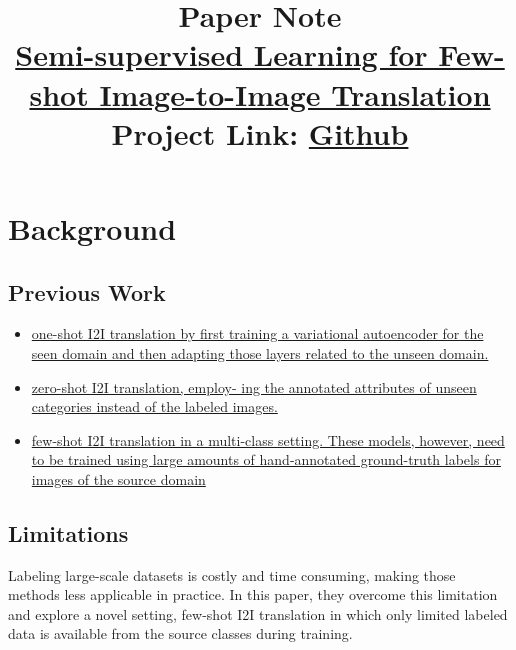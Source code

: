 \documentclass[10pt]{article}
\title{
    {\normalsize Paper Note} \\
    {\large \href{https://openaccess.thecvf.com/content_CVPR_2020/papers/Wang_Semi-Supervised_Learning_for_Few-Shot_Image-to-Image_Translation_CVPR_2020_paper.pdf}{Semi-supervised Learning for Few-shot Image-to-Image Translation
    }} \\
    {\normalsize Project Link: \href{https://github.com/yaxingwang/SEMIT}{Github}}
}
\begin{document}
    \maketitle

    \section{Background}
        \subsection*{Previous Work}
            \begin{itemize}
                \item \href{https://arxiv.org/pdf/1806.06029.pdf}{one-shot I2I translation by first training a variational autoencoder for the seen domain and then adapting those layers related to the unseen domain.}
                \item \href{https://arxiv.org/pdf/1906.00184.pdf}{zero-shot I2I translation, employ- ing the annotated attributes of unseen categories instead of the labeled images.}
                \item \href{https://arxiv.org/pdf/1905.01723.pdf}{few-shot I2I translation in a multi-class setting. These models, however, need to be trained using large amounts of hand-annotated ground-truth labels for images of the source domain}
            \end{itemize} 

        \subsection*{Limitations}
            Labeling large-scale datasets is costly and time consuming, making those methods less applicable in practice. 
            In this paper, they overcome this limitation and explore a novel setting, few-shot I2I translation
            in which only limited labeled data is available from the source classes during training. \\
        
\end{document}
